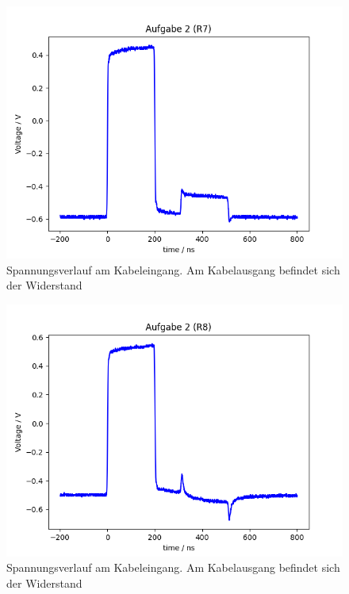 \documentclass{article}
\begin{document}
\begin{figure}[H]
\centering
\caption{Spannungsverlauf am Kabeleingang. Am Kabelausgang befindet sich der Widerstand }
\label{fig:task2_R7}
\includegraphics[scale=0.6]{bilder/task2/task2_R7.png}
\end{figure}





\begin{figure}[H]
\centering
\caption{Spannungsverlauf am Kabeleingang. Am Kabelausgang befindet sich der Widerstand }
\label{fig:task2_R8}
\includegraphics[scale=0.6]{bilder/task2/task2_R8.png}
\end{figure}
\end{document}
